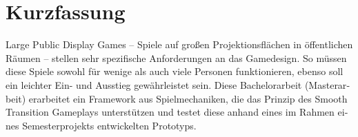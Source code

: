 \chapter{Kurzfassung}

\begin{german}
Large Public Display Games -- Spiele auf großen Projektionsflächen in
öffentlichen Räumen -- stellen sehr spezifische Anforderungen an das Gamedesign.
So müssen diese Spiele sowohl für wenige als auch viele Personen funktionieren,
ebenso soll ein leichter Ein- und Ausstieg gewährleistet sein. Diese
Bachelorarbeit (Masterarbeit) erarbeitet ein Framework aus Spielmechaniken, die
das Prinzip des Smooth Transition Gameplays unterstützen und testet diese anhand
eines im Rahmen eines Semesterprojekts entwickelten Prototyps.
\end{german}
